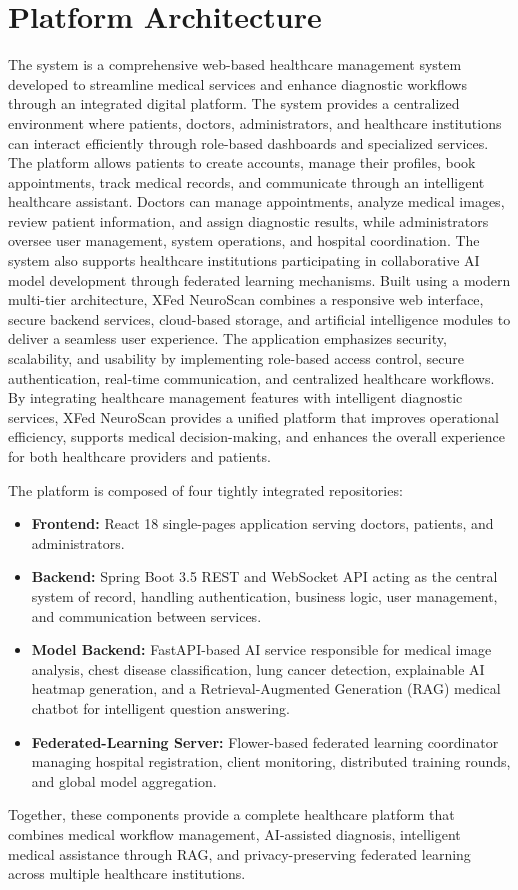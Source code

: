 \section{Platform Architecture}
The system  is a comprehensive web-based healthcare management system developed to streamline medical services and enhance diagnostic workflows through an integrated digital platform. The system provides a centralized environment where patients, doctors, administrators, and healthcare institutions can interact efficiently through role-based dashboards and specialized services.
The platform allows patients to create accounts, manage their profiles, book appointments, track medical records, and communicate through an intelligent healthcare assistant. Doctors can manage appointments, analyze medical images, review patient information, and assign diagnostic results, while administrators oversee user management, system operations, and hospital coordination. The system also supports healthcare institutions participating in collaborative AI model development through federated learning mechanisms.
Built using a modern multi-tier architecture, XFed NeuroScan combines a responsive web interface, secure backend services, cloud-based storage, and artificial intelligence modules to deliver a seamless user experience. The application emphasizes security, scalability, and usability by implementing role-based access control, secure authentication, real-time communication, and centralized healthcare workflows.
By integrating healthcare management features with intelligent diagnostic services, XFed NeuroScan provides a unified platform that improves operational efficiency, supports medical decision-making, and enhances the overall experience for both healthcare providers and patients.

The platform is composed of four tightly integrated repositories:
\begin{itemize}
	\item \textbf{Frontend:} React 18 single-pages application serving doctors, patients, and administrators.
	\item \textbf{Backend:} Spring Boot 3.5 REST and WebSocket API acting as the central system of record, handling authentication, business logic, user management, and communication between services.
	\item \textbf{Model Backend:} FastAPI-based AI service responsible for medical image analysis, chest disease classification, lung cancer detection, explainable AI heatmap generation, and a Retrieval-Augmented Generation (RAG) medical chatbot for intelligent question answering.
	\item \textbf{Federated-Learning Server:} Flower-based federated learning coordinator managing hospital registration, client monitoring, distributed training rounds, and global model aggregation.
\end{itemize} 
Together, these components provide a complete healthcare platform that combines medical workflow management, AI-assisted diagnosis, intelligent medical assistance through RAG, and privacy-preserving federated learning across multiple healthcare institutions.

